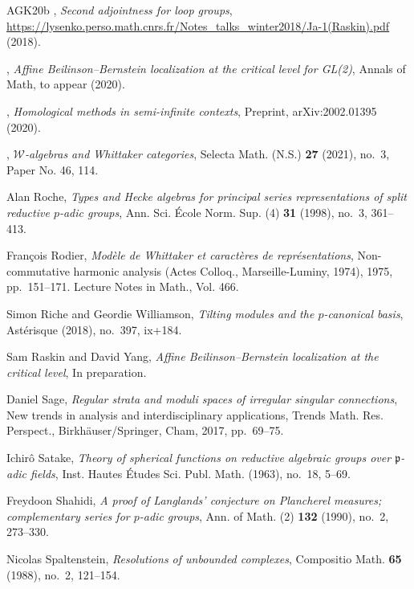 \begin{thebibliography}{AGK{\etalchar{+}}20b}
\bysame, \emph{Second adjointness for loop groups},
  \url{https://lysenko.perso.math.cnrs.fr/Notes_talks_winter2018/Ja-1(Raskin).pdf}
  (2018).

\bysame, \emph{Affine {B}eilinson--{B}ernstein localization at the critical
  level for {GL}(2)}, Annals of Math, to appear (2020).

\bysame, \emph{{H}omological methods in semi-infinite contexts}, Preprint,
  arXiv:2002.01395 (2020).

\bysame, \emph{{$\mathscr{W}$}-algebras and {W}hittaker categories}, Selecta
  Math. (N.S.) \textbf{27} (2021), no.~3, Paper No. 46, 114.

Alan Roche, \emph{Types and {H}ecke algebras for principal series
  representations of split reductive {$p$}-adic groups}, Ann. Sci. \'{E}cole
  Norm. Sup. (4) \textbf{31} (1998), no.~3, 361--413.

Fran\c{c}ois Rodier, \emph{Mod\`ele de {W}hittaker et caract\`eres de
  repr\'{e}sentations}, Non-commutative harmonic analysis ({A}ctes {C}olloq.,
  {M}arseille-{L}uminy, 1974), 1975, pp.~151--171. Lecture Notes in Math., Vol.
  466.

Simon Riche and Geordie Williamson, \emph{Tilting modules and the
  {$p$}-canonical basis}, Ast\'{e}risque (2018), no.~397, ix+184.

Sam Raskin and David Yang, \emph{Affine {B}eilinson--{B}ernstein localization
  at the critical level}, In preparation.

Daniel Sage, \emph{Regular strata and moduli spaces of irregular singular
  connections}, New trends in analysis and interdisciplinary applications,
  Trends Math. Res. Perspect., Birkh\"{a}user/Springer, Cham, 2017, pp.~69--75.

Ichir\^{o} Satake, \emph{Theory of spherical functions on reductive algebraic
  groups over {${\mathfrak p}$}-adic fields}, Inst. Hautes \'{E}tudes Sci.
  Publ. Math. (1963), no.~18, 5--69.

Freydoon Shahidi, \emph{A proof of {L}anglands' conjecture on {P}lancherel
  measures; complementary series for {$p$}-adic groups}, Ann. of Math. (2)
  \textbf{132} (1990), no.~2, 273--330.

Nicolas Spaltenstein, \emph{Resolutions of unbounded complexes}, Compositio
  Math. \textbf{65} (1988), no.~2, 121--154.


\end{thebibliography}
